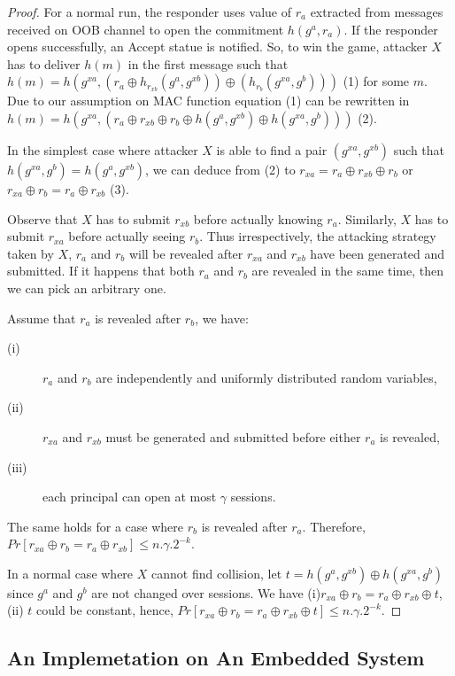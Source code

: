 \begin{proof}
For a normal run, the responder uses value of $r_a$ extracted from messages received on OOB channel to open the commitment $h(g^a, r_a)$. If the responder opens successfully, an Accept statue is notified. So, to win the game, attacker $X$ has to deliver $h(m)$ in the first message such that $h(m) = h(g^{xa}, (r_a \oplus h_{r_{xb}}(g^a,g^{xb})) \oplus (h_{r_b}(g^{xa},g^b)))$ (1) for some $m$. Due to our assumption on MAC function equation (1) can be rewritten in $h(m) = h(g^{xa}, (r_a \oplus r_{xb} \oplus r_b \oplus h(g^a,g^{xb}) \oplus h(g^{xa},g^b)))$ (2). 

In the simplest case where attacker $X$ is able to find a pair $(g^{xa},g^{xb})$ such that $h(g^{xa},g^b) = h(g^a,g^{xb})$, we can deduce from (2) to $r_{xa} = r_a \oplus r_{xb} \oplus r_b$ or $r_{xa} \oplus r_b = r_a \oplus r_{xb}$ (3).

Observe that $X$ has to submit $r_{xb}$ before actually knowing $r_a$. Similarly, $X$ has to submit $r_{xa}$ before actually seeing $r_b$. Thus irrespectively, the attacking strategy taken by $X$, $r_a$ and $r_b$ will be revealed after $r_{xa}$ and $r_{xb}$ have been generated and submitted. If it happens that both $r_a$ and $r_b$ are revealed in the same time, then we can pick an arbitrary one. 

Assume that $r_a$ is revealed after $r_b$, we have:
\begin{description}
 \item [(i)] $r_a$ and $r_b$ are independently and uniformly distributed random variables, 
 \item [(ii)] $r_{xa}$ and $r_{xb}$ must be generated and submitted before either $r_a$ is revealed, 
 \item [(iii)] each principal can open at most $\gamma$ sessions. 
\end{description}
The same holds for a case where $r_b$ is revealed after $r_a$. Therefore, $Pr[r_{xa} \oplus r_b = r_a \oplus r_{xb}] \leq n.\gamma.2^{-k}$.

In a normal case where $X$ cannot find collision, let $t= h(g^a,g^{xb}) \oplus h(g^{xa},g^b)$ since $g^a$ and $g^b$ are not changed over sessions. We have (i)$r_{xa} \oplus r_b = r_a \oplus r_{xb} \oplus t $, (ii) $t$ could be constant, hence, $Pr[r_{xa} \oplus r_b = r_a \oplus r_{xb} \oplus t ] \leq n.\gamma.2^{-k}$. 
\end{proof}

\subsection{An Implemetation on An Embedded System} 

